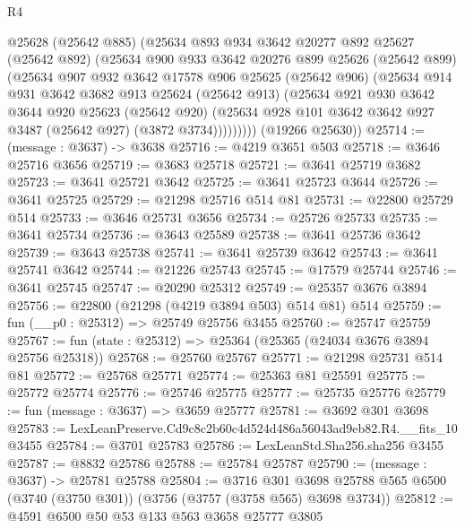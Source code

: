 \begin{lexlean}{R4}
\begin{coremodule}
          @25628
          (@25642 @885)
          (@25634
            @893
            @934
            @3642
            @20277
            @892
            @25627
            (@25642 @892)
            (@25634
              @900
              @933
              @3642
              @20276
              @899
              @25626
              (@25642 @899)
              (@25634
                @907
                @932
                @3642
                @17578
                @906
                @25625
                (@25642 @906)
                (@25634
                  @914
                  @931
                  @3642
                  @3682
                  @913
                  @25624
                  (@25642 @913)
                  (@25634
                    @921
                    @930
                    @3642
                    @3644
                    @920
                    @25623
                    (@25642 @920)
                    (@25634 @928 @101 @3642 @3642 @927 @3487 (@25642 @927) (@3872 @3734)))))))))
      (@19266 @25630))
@25714 := (message : @3637) -> @3638
@25716 := @4219 @3651 @503
@25718 := @3646 @25716 @3656
@25719 := @3683 @25718
@25721 := @3641 @25719 @3682
@25723 := @3641 @25721 @3642
@25725 := @3641 @25723 @3644
@25726 := @3641 @25725
@25729 := @21298 @25716 @514 @81
@25731 := @22800 @25729 @514
@25733 := @3646 @25731 @3656
@25734 := @25726 @25733
@25735 := @3641 @25734
@25736 := @3643 @25589
@25738 := @3641 @25736 @3642
@25739 := @3643 @25738
@25741 := @3641 @25739 @3642
@25743 := @3641 @25741 @3642
@25744 := @21226 @25743
@25745 := @17579 @25744
@25746 := @3641 @25745
@25747 := @20290 @25312
@25749 := @25357 @3676 @3894
@25756 := @22800 (@21298 (@4219 @3894 @503) @514 @81) @514
@25759 := fun (__p0 : @25312) => @25749 @25756 @3455
@25760 := @25747 @25759
@25767 := fun (state : @25312) => @25364 (@25365 (@24034 @3676 @3894 @25756 @25318))
@25768 := @25760 @25767
@25771 := @21298 @25731 @514 @81
@25772 := @25768 @25771
@25774 := @25363 @81 @25591
@25775 := @25772 @25774
@25776 := @25746 @25775
@25777 := @25735 @25776
@25779 := fun (message : @3637) => @3659 @25777
@25781 := @3692 @301 @3698
@25783 := LexLeanPreserve.Cd9c8c2b60c4d524d486a56043ad9eb82.R4.__fits_10 @3455
@25784 := @3701 @25783
@25786 := LexLeanStd.Sha256.sha256 @3455
@25787 := @8832 @25786
@25788 := @25784 @25787
@25790 := (message : @3637) -> @25781 @25788
@25804 := @3716
    @301
    @3698
    @25788
    @565
    @6500
    (@3740 (@3750 @301))
    (@3756 (@3757 (@3758 @565) @3698 @3734))
@25812 := @4591 @6500 @50 @53 @133 @563 @3658 @25777 @3805

\end{coremodule}
\end{lexlean}
